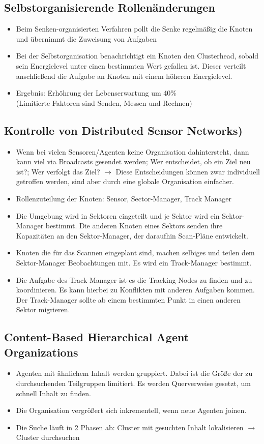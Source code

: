 \documentclass{article} %
\begin{document}
	\subsection{Selbstorganisierende Rollenänderungen}
		\begin{itemize}
		\item Beim Senken-organisierten Verfahren pollt die Senke regelmäßig die Knoten und übernimmt die Zuweisung von Aufgaben
		\item Bei der Selbstorganisation benachrichtigt ein Knoten den Clusterhead, sobald sein Energielevel unter einen bestimmten Wert gefallen ist. Dieser verteilt anschließend die Aufgabe an Knoten mit einem höheren Energielevel.
		\item Ergebnis: Erhöhrung der Lebenserwartung um 40\%\\
		(Limitierte Faktoren sind Senden, Messen und Rechnen)
			\end{itemize}
	\subsection{Kontrolle von Distributed Sensor Networks)}
		\begin{itemize}
		\item Wenn bei vielen Sensoren/Agenten keine Organisation dahintersteht, dann kann viel via Broadcasts gesendet werden; Wer entscheidet, ob ein Ziel neu ist?; Wer verfolgt das Ziel? $\rightarrow$ Diese Entscheidungen können zwar individuell getroffen werden, sind aber durch eine globale Organisation einfacher.
		\item Rollenzuteilung der Knoten: Sensor, Sector-Manager, Track Manager
		\item Die Umgebung wird in Sektoren eingeteilt und je Sektor wird ein Sektor-Manager bestimmt. Die anderen Knoten eines Sektors senden ihre Kapazitäten an den Sektor-Manager, der daraufhin Scan-Pläne entwickelt.
		\item Knoten die für das Scannen eingeplant sind, machen selbiges und teilen dem Sektor-Manager Beobachtungen mit. Es wird ein Track-Manager bestimmt.
		\item Die Aufgabe des Track-Manager ist es die Tracking-Nodes zu finden und zu koordinieren. Es kann hierbei zu Konflikten mit anderen Aufgaben kommen. Der Track-Manager sollte ab einem bestimmten Punkt in einen anderen Sektor migrieren.
		\end{itemize}
	\subsection{Content-Based Hierarchical Agent Organizations}
		\begin{itemize}
		\item Agenten mit ähnlichem Inhalt werden gruppiert. Dabei ist die Größe der zu durchsuchenden Teilgruppen limitiert. Es werden Querverweise gesetzt, um schnell Inhalt zu finden.
		\item Die Organisation vergrößert sich inkrementell, wenn neue Agenten joinen.
		\item Die Suche läuft in 2 Phasen ab: Cluster mit gesuchten Inhalt lokalisieren $\rightarrow$ Cluster durchsuchen
		\end{itemize}
\end{document}
